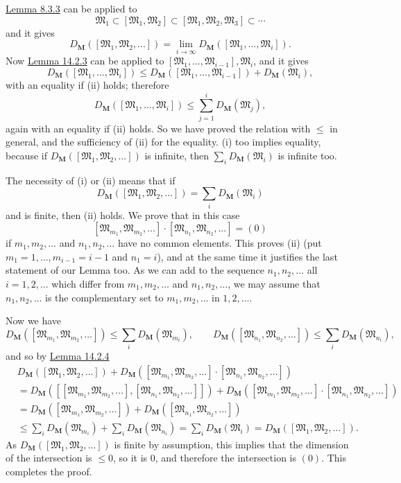 \documentclass[12pt,b5paper,twoside]{article}
\newcommand{\M}{\mathbf M}
\newcommand{\lemref}[1]{\hyperref[lem:#1]{Lemma #1}}
\begin{document}
\lemref{8.3.3} can be applied to
\[
\mathfrak M_1\subset[\mathfrak M_1,\mathfrak M_2]
\subset[\mathfrak M_1,\mathfrak M_2,\mathfrak M_3]\subset\cdots
\]
and it gives
\[
D_{\M}([\mathfrak M_1,\mathfrak M_2,\ldots])
=\lim_{i\to\infty}D_{\M}([\mathfrak M_1,\ldots,\mathfrak M_i]).
\]
Now \lemref{14.2.3} can be applied to
\([\mathfrak M_1,\ldots,\mathfrak M_{i-1}],\mathfrak M_i\), and it gives
\[
D_{\M}([\mathfrak M_1,\ldots,\mathfrak M_i])
\leq D_{\M}([\mathfrak M_1,\ldots,\mathfrak M_{i-1}])
 +D_{\M}(\mathfrak M_i),
\]
with an equality if (ii) holds; therefore
\[
D_{\M}([\mathfrak M_1,\ldots,\mathfrak M_i])
\leq\sum_{j=1}^{i}D_{\M}(\mathfrak M_j),
\]
again with an equality if (ii) holds. So we have proved the relation with
\(\leq\) in general, and the sufficiency of (ii) for the equality. (i) too
implies equality, because if
\(D_{\M}([\mathfrak M_1,\mathfrak M_2,\ldots])\) is infinite, then
\(\sum_iD_{\M}(\mathfrak M_i)\) is infinite too.

The necessity of (i) or (ii) means that if
\[
D_{\M}([\mathfrak M_1,\mathfrak M_2,\ldots])
=\sum_iD_{\M}(\mathfrak M_i)
\]
and is finite, then (ii) holds. We prove that in this case
\[
[\mathfrak M_{m_1},\mathfrak M_{m_2},\ldots]
 \cdot[\mathfrak M_{n_1},\mathfrak M_{n_2},\ldots]=(0)
\]
if \(m_1,m_2,\ldots\) and \(n_1,n_2,\ldots\) have no common elements.
This proves (ii) (put \(m_1=1,\ldots,m_{i-1}=i-1\) and \(n_1=i\)), and at
the same time it justifies the last statement of our Lemma too. As we can add
to the sequence \(n_1,n_2,\ldots\) all \(i=1,2,\ldots\) which differ from
\(m_1,m_2,\ldots\) and \(n_1,n_2,\ldots\), we may assume that
\(n_1,n_2,\ldots\) is the complementary set to \(m_1,m_2,\ldots\) in
\(1,2,\ldots\).

Now we have
\[
D_{\M}([\mathfrak M_{m_1},\mathfrak M_{m_2},\ldots])
 \leq\sum_iD_{\M}(\mathfrak M_{m_i}),\qquad
D_{\M}([\mathfrak M_{n_1},\mathfrak M_{n_2},\ldots])
 \leq\sum_iD_{\M}(\mathfrak M_{n_i}),
\]
and so by \lemref{14.2.4}
\[
\begin{aligned}
&D_{\M}([\mathfrak M_1,\mathfrak M_2,\ldots])
 +D_{\M}([\mathfrak M_{m_1},\mathfrak M_{m_2},\ldots]
   \cdot[\mathfrak M_{n_1},\mathfrak M_{n_2},\ldots])\\
&=D_{\M}([[\mathfrak M_{m_1},\mathfrak M_{m_2},\ldots],
            [\mathfrak M_{n_1},\mathfrak M_{n_2},\ldots]])
 +D_{\M}([\mathfrak M_{m_1},\mathfrak M_{m_2},\ldots]
   \cdot[\mathfrak M_{n_1},\mathfrak M_{n_2},\ldots])\\
&=D_{\M}([\mathfrak M_{m_1},\mathfrak M_{m_2},\ldots])
 +D_{\M}([\mathfrak M_{n_1},\mathfrak M_{n_2},\ldots])\\
&\leq\sum_iD_{\M}(\mathfrak M_{m_i})
 +\sum_iD_{\M}(\mathfrak M_{n_i})
 =\sum_iD_{\M}(\mathfrak M_i)
 =D_{\M}([\mathfrak M_1,\mathfrak M_2,\ldots]).
\end{aligned}
\]
As \(D_{\M}([\mathfrak M_1,\mathfrak M_2,\ldots])\) is finite by
assumption, this implies that the dimension of the intersection is \(\leq0\),
so it is \(0\), and therefore the intersection is \((0)\). This completes
the proof.
\end{document}
